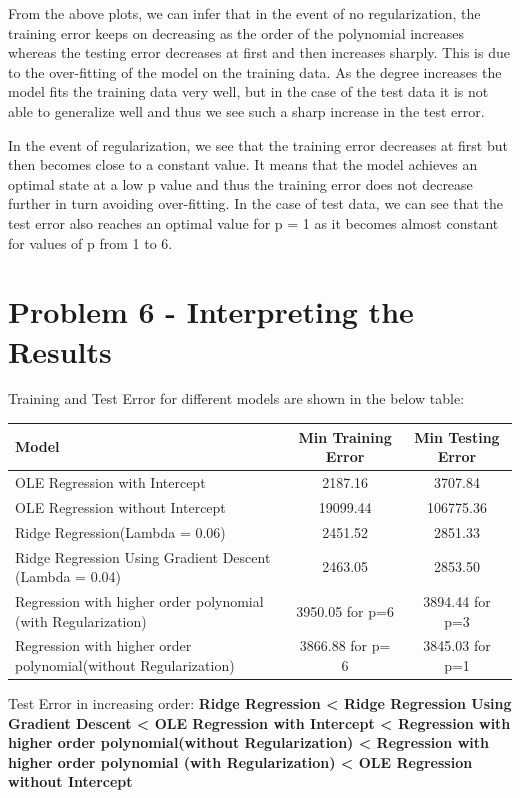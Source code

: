 \documentclass[12pt]{extarticle}
\begin{document}
From the above plots, we can infer that in the event of no regularization, the training error keeps on decreasing as the order of the polynomial increases whereas the testing error decreases at first and then increases sharply. This is due to the over-fitting of the model on the training data. As the degree increases the model fits the training data very well, but in the case of the test data it is not able to generalize well and thus we see such a sharp increase in the test error.


\vspace{3mm}
In the event of regularization, we see that the training error decreases at first but then becomes close to a constant value. It means that the model achieves an optimal state at a low p value and thus the training error does not decrease further in turn avoiding over-fitting. In the case of test data, we can see that the test error also reaches an optimal value for p = 1 as it becomes almost constant for values of p from 1 to 6. 

\newpage
\section{Problem 6 - Interpreting the Results }

Training and Test Error for different models are shown in the below table:

\vspace{5 mm}
\begin{tabularx}{\textwidth}{|X|c|c|}
\rowcolor[HTML]{FFCE93}
\hline
Model & Min Training Error & Min Testing Error \\ \hline

OLE Regression with Intercept & 2187.16 &3707.84 \\ \hline
OLE Regression without Intercept & 19099.44& 106775.36\\ \hline
Ridge Regression(Lambda = 0.06) &2451.52& 2851.33\\ \hline
Ridge Regression Using Gradient Descent (Lambda = 0.04) &2463.05&2853.50\\ \hline
Regression with higher order polynomial (with Regularization) &3950.05 for p=6 &3894.44 for p=3\\ \hline
Regression with higher order polynomial(without Regularization) &3866.88  for p= 6 &3845.03 for p=1 \\ \hline
\end{tabularx}

\vspace{5mm}
Test Error in increasing order: 
\textbf{Ridge Regression < Ridge Regression Using Gradient Descent < OLE Regression with Intercept < Regression with higher order polynomial(without Regularization) < Regression with higher order polynomial (with Regularization) < OLE Regression without Intercept}
\end{document}
